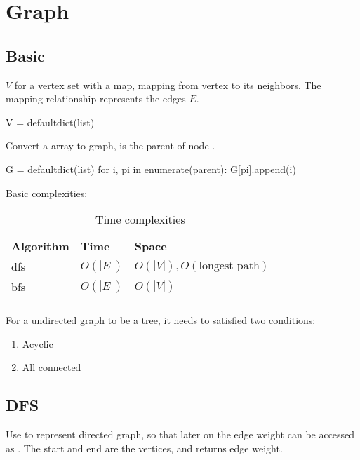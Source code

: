 \chapter{Graph}

\section{Basic}
 $V$ for a vertex set with a map, mapping from vertex to its neighbors. The mapping relationship represents the edges $E$.
\begin{python}
V = defaultdict(list)
\end{python}

Convert a  array to graph,  is the parent of node . 
\begin{python}
G = defaultdict(list)
for i, pi in enumerate(parent):
    G[pi].append(i)
\end{python}
 Basic complexities:

\begin{table}

\begin{tabular}{lll}
\hline\noalign{\smallskip}
\textbf{Algorithm} & \textbf{Time}  & \textbf{Space}\\
\noalign{\smallskip}\hline\noalign{\smallskip}
dfs & $O(|E|)$ & $O(|V|), O(\text{longest path})$ \\
bfs & $O(|E|)$ & $O(|V|)$ \\
\noalign{\smallskip}\hline\noalign{\smallskip}
\end{tabular}

\caption{Time complexities}
\end{table}

 For a undirected graph to be a tree, it needs to satisfied two conditions:
\begin{enumerate}
\item Acyclic
\item All connected
\end{enumerate}

\section{DFS}
Use  to represent directed graph, so that later on the edge weight can be accessed as . The  start and  end are the vertices, and  returns edge weight.

